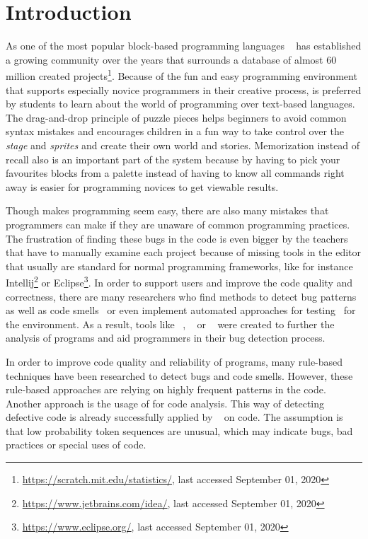 \chapter{Introduction}\label{chap:introduction}

As one of the most popular block-based programming languages \scratch{}~\cite{scratch} has established a growing community over the years that surrounds a database of almost 60 million created projects\footnote{\url{https://scratch.mit.edu/statistics/}, last accessed September 01, 2020}. Because of the fun and easy programming environment that supports especially novice programmers in their creative process, \scratch{} is preferred by students to learn about the world of programming over text-based languages. The drag-and-drop principle of puzzle pieces helps beginners to avoid common syntax mistakes and encourages children in a fun way to take control over the \textit{stage} and \textit{sprites} and create their own world and stories. Memorization instead of recall also is an important part of the \scratch{} system because by having to pick your favourites blocks from a palette instead of having to know all commands right away is easier for programming novices to get viewable results. 

Though \scratch{} makes programming seem easy, there are also many mistakes that programmers can make if they are unaware of common programming practices. The frustration of finding these bugs in the code is even bigger by the teachers that have to manually examine each project because of missing tools in the \scratch{} editor that usually are standard for normal programming frameworks, like for instance Intellij\footnote{\url{https://www.jetbrains.com/idea/}, last accessed September 01, 2020} or Eclipse\footnote{\url{https://www.eclipse.org/}, last accessed September 01, 2020}. In order to support \scratch{} users and improve the code quality and correctness, there are many researchers who find methods to detect bug patterns~\cite{scratch_bugpatterns} as well as code smells~\cite{badsmells, badhabits, hairball} or even implement automated approaches for testing~\cite{whisker} for the \scratch{} environment. As a result, tools like \hairball~\cite{hairball}, \drscratch~\cite{drscratch} or \litterbox~\cite{scratch_bugpatterns} were created to further the analysis of \scratch{} programs and aid programmers in their bug detection process.

In order to improve code quality and reliability of programs, many rule-based techniques have been researched to detect bugs and code smells. However, these rule-based approaches are relying on highly frequent patterns in the code. Another approach is the usage of  for code analysis. This way of detecting defective code is already successfully applied by \bugram{}~\cite{bugram} on \java{} code. The assumption is that low probability token sequences are unusual, which may indicate bugs, bad practices or special uses of code. 

